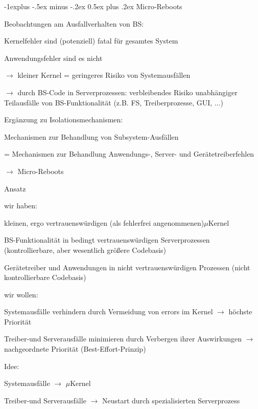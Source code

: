 \documentclass[a4paper]{article}
\makeatletter
\renewcommand{\subsection}{\@startsection{subsection}{2}{0mm}%
 {-1explus -.5ex minus -.2ex}%
 {0.5ex plus .2ex}%
 {\normalfont\normalsize\bfseries}}
\makeatother
\begin{document}
\begin{multicols}{3}
    \subsection{Micro-Reboots}
    \begin{itemize*}
        \item Beobachtungen am Ausfallverhalten von BS:
        \item Kernelfehler sind (potenziell) fatal für gesamtes System
        \item Anwendungsfehler sind es nicht
        \item[$\rightarrow$] kleiner Kernel = geringeres Risiko von Systemausfällen
        \item[$\rightarrow$] durch BS-Code in Serverprozessen: verbleibendes Risiko unabhängiger Teilausfälle von BS-Funktionalität (z.B. FS, Treiberprozesse, GUI, ...)
        \item Ergänzung zu Isolationsmechanismen:
        \item Mechanismen zur Behandlung von Subsystem-Ausfällen
        \item = Mechanismen zur Behandlung Anwendungs-, Server- und Gerätetreiberfehlen
        \item[$\rightarrow$] Micro-Reboots
    \end{itemize*}

    Ansatz

    \begin{itemize*}
        \item
        wir haben:
        \item
        kleinen, ergo vertrauenswürdigen (als fehlerfrei angenommenen)$\mu$Kernel
        \item
        BS-Funktionalität in bedingt vertrauenswürdigen Serverprozessen
        (kontrollierbare, aber wesentlich größere Codebasis)
        \item
        Gerätetreiber und Anwendungen in nicht vertrauenswürdigen Prozessen
        (nicht kontrollierbare Codebasis)
        \item
        wir wollen:
        \item
        Systemausfälle verhindern durch Vermeidung von errors im Kernel
        $\rightarrow$ höchste Priorität
        \item
        Treiber-und Serverausfälle minimieren durch Verbergen ihrer
        Auswirkungen $\rightarrow$ nachgeordnete Priorität
        (Best-Effort-Prinzip)
        \item
        Idee:
        \begin{itemize*}
            \item Systemausfälle $\rightarrow$ $\mu$Kernel
            \item Treiber-und Serverausfälle $\rightarrow$ Neustart durch spezialisierten Serverprozess
        \end{itemize*}
    \end{itemize*}


\end{multicols}
\end{document}
